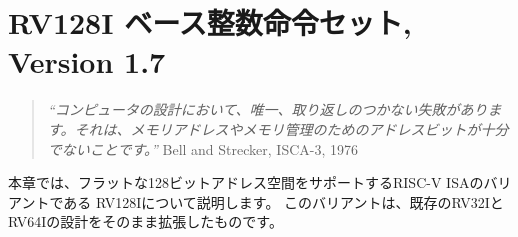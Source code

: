 \begin{comment}
\chapter{RV128I Base Integer Instruction Set, Version 1.7}
\end{comment}
\chapter{RV128I ベース整数命令セット, Version 1.7}
\label{rv128}

\begin{quote}
\begin{comment}
{\em ``There is only one mistake that can be made in computer design that is
difficult to recover from---not having enough address bits for memory
addressing and memory management.''} Bell and Strecker, ISCA-3, 1976.
\end{comment}
{\em ``コンピュータの設計において、唯一、取り返しのつかない失敗があります。それは、メモリアドレスやメモリ管理のためのアドレスビットが十分でないことです。''} Bell and Strecker, ISCA-3, 1976
\end{quote}

\begin{comment}
This chapter describes RV128I, a variant of the RISC-V ISA
supporting a flat 128-bit address space.  The variant is a
straightforward extrapolation of the existing RV32I and RV64I designs.
\end{comment}

本章では、フラットな128ビットアドレス空間をサポートするRISC-V ISAのバリアントである
RV128Iについて説明します。 このバリアントは、既存のRV32IとRV64Iの設計をそのまま拡張したものです。

